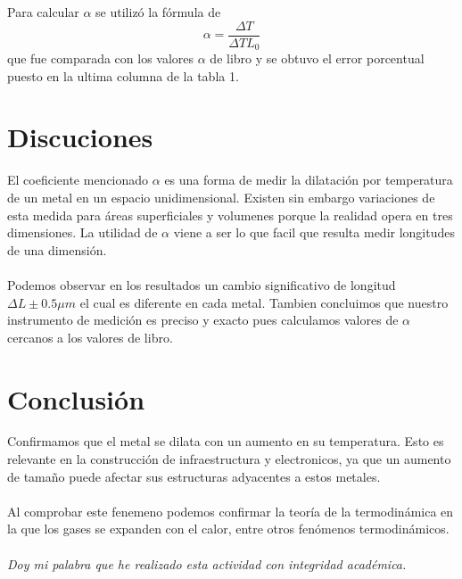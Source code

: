 \documentclass[a4paper,12pt]{article}
\begin{document}
Para calcular $\alpha$ se utilizó la fórmula de 
\[\alpha = \frac{\Delta T}{\Delta TL_{0}}\]
que fue comparada con los valores $\alpha$ de libro y se obtuvo el error porcentual puesto en la ultima columna de la tabla 1.

\section*{Discuciones}
El coeficiente mencionado $\alpha$ es una forma de medir la dilatación por temperatura de un metal en un espacio unidimensional. Existen sin embargo variaciones de esta medida para áreas superficiales y volumenes porque la realidad opera en tres dimensiones. La utilidad de $\alpha$ viene a ser lo que facil que resulta medir longitudes de una dimensión.
\\\\
Podemos observar en los resultados un cambio significativo de longitud $\Delta L \pm 0.5\mu m$ el cual es diferente en cada metal. Tambien concluimos que nuestro instrumento de medición es preciso y exacto pues calculamos valores de $\alpha$ cercanos a los valores de libro.

\section*{Conclusión}
Confirmamos que el metal se dilata con un aumento en su temperatura. Esto es relevante en la construcción de infraestructura y electronicos, ya que un aumento de tamaño puede afectar sus estructuras adyacentes a estos metales.
\\\\
Al comprobar este fenemeno podemos confirmar la teoría de la termodinámica en la que los gases se expanden con el calor, entre otros fenómenos termodinámicos.
\\\\
\textit{Doy mi palabra que he realizado esta actividad con integridad académica.}
\end{document}
